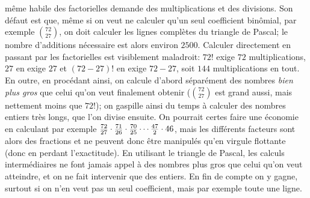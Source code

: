 {m\^eme habile des factorielles demande des multiplications et des 
divisions. Son  d\'efaut est que, m\^eme si on veut ne calculer qu'un seul 
coefficient bin\^omial, par exemple ${72 \choose 27}$, on doit calculer les 
lignes compl\`etes du triangle de Pascal; le nombre d'additions n\'ecessaire  
est alors environ $2500$. Calculer directement en passant par les 
factorielles est visiblement maladroit:  $72!$ exige $72$ 
multiplications, $27$ en exige $27$ et $(72-27)!$ en exige $72-27$, soit 
$144$ multiplications en tout. En outre, en proc\'edant ainsi, on calcule 
d'abord s\'epar\'ement des nombres {\it bien plus gros} que celui qu'on veut 
finalement obtenir (${72 \choose 27}$ est grand aussi,  mais nettement 
moins que $72!$);  on gaspille ainsi du temps \`a calculer des nombres 
entiers tr\`es longs,  que l'on divise ensuite.  On pourrait certes faire
une \'economie en calculant par exemple ${72 \over 27} \cdot {71 \over 26}  
\cdot {70 \over 25} \cdots {47 \over 2} \cdot 46$, mais les diff\'erents 
facteurs sont alors des fractions et ne peuvent donc \^etre manipul\'es 
qu'en virgule flottante (donc en perdant l'exactitude). En utilisant le 
triangle de Pascal, les calculs interm\'ediaires ne font jamais appel \` a 
des nombres plus gros que celui qu'on veut atteindre, et on ne fait 
intervenir que des entiers. En fin de compte on y gagne, surtout si on n'en 
veut pas un seul coefficient, mais par exemple toute une ligne. \par} 
\medskip 
 
\def\ldown#1{\hbox{\raise1.5pt\hbox{$#1$}}} 
 
